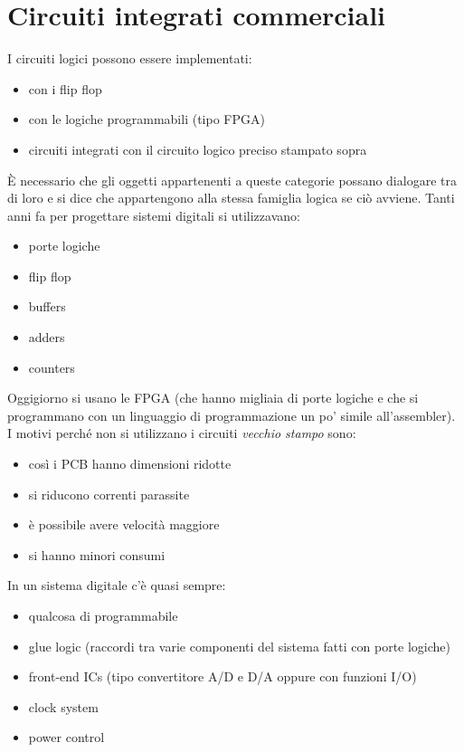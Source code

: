 \documentclass[
]{book}
\providecommand{\tightlist}{%
  \setlength{\itemsep}{0pt}\setlength{\parskip}{0pt}}
\begin{document}
\section{Circuiti integrati
commerciali}\label{circuiti-integrati-commerciali}

I circuiti logici possono essere implementati:

\begin{itemize}
\tightlist
\item
  con i flip flop
\item
  con le logiche programmabili (tipo FPGA)
\item
  circuiti integrati con il circuito logico preciso stampato sopra
\end{itemize}

È necessario che gli oggetti appartenenti a queste categorie possano
dialogare tra di loro e si dice che appartengono alla stessa famiglia
logica se ciò avviene. Tanti anni fa per progettare sistemi digitali si
utilizzavano:

\begin{itemize}
\tightlist
\item
  porte logiche
\item
  flip flop
\item
  buffers
\item
  adders
\item
  counters
\end{itemize}

Oggigiorno si usano le FPGA (che hanno migliaia di porte logiche e che
si programmano con un linguaggio di programmazione un po' simile
all'assembler). I motivi perché non si utilizzano i circuiti
\emph{vecchio stampo} sono:

\begin{itemize}
\tightlist
\item
  così i PCB hanno dimensioni ridotte
\item
  si riducono correnti parassite
\item
  è possibile avere velocità maggiore
\item
  si hanno minori consumi
\end{itemize}

In un sistema digitale c'è quasi sempre:

\begin{itemize}
\tightlist
\item
  qualcosa di programmabile
\item
  glue logic (raccordi tra varie componenti del sistema fatti con porte
  logiche)
\item
  front-end ICs (tipo convertitore A/D e D/A oppure con funzioni I/O)
\item
  clock system
\item
  power control
\end{itemize}
\end{document}
